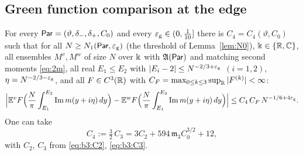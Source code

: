 \subsection{Green function comparison at the edge}\label{sec:gfc}
\begin{theorem}\label{thm:gfc}
For every $\mathsf{Par}=(\vartheta,\delta_-,\delta_+,C_0)$ and every $\varepsilon_{\mathrm g}\in(0,\frac1{10}]$ there is $C_4=C_4(\vartheta,C_0)$ such that for all
$N\ge N_1(\mathsf{Par},\varepsilon_{\mathrm g})$ \textup{(}the threshold of Lemma~\ref{lem:N0}\textup{)}, $\Bbbk\in\{\mathbb{R},\mathbb{C}\}$, all ensembles $M^v,M^w$ of size $N$ over $\Bbbk$ with $\mathfrak{A}(\mathsf{Par})$ and matching second moments \eqref{eq:2m}, all real $E_1\le E_2$ with
$|E_i-2|\le N^{-2/3+\varepsilon_{\mathrm g}}$ $(i=1,2)$, $\eta=N^{-2/3-\varepsilon_{\mathrm g}}$, and all $F\in C^3(\mathbb{R})$ with $C_F=\max_{0\le k\le3}\sup_{\mathbb{R}}|F^{(k)}|<\infty$:
\begin{equation}\label{eq:b3:gfc}
\Big|\mathbb{E}^vF\Big(\frac N\pi\int_{E_1}^{E_2}\operatorname{Im} m(y+i\eta)\,dy\Big)-\mathbb{E}^wF\Big(\frac N\pi\int_{E_1}^{E_2}\operatorname{Im} m(y+i\eta)\,dy\Big)\Big|\le C_4\,C_F\,N^{-1/6+4\varepsilon_{\mathrm g}}.
\end{equation}
One can take
\begin{equation}\label{eq:b3:C4}
C_4:=\tfrac32\,C_3=3C_2+594\,\mathfrak m_3C_0^{3/2}+12,
\end{equation}
with $C_2$, $C_3$ from \eqref{eq:b3:C2}, \eqref{eq:b3:C3}.
\end{theorem}
